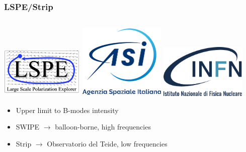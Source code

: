 \documentclass[10pt,aspectratio=169]{beamer}
\begin{document}
\begin{frame}
\frametitle{LSPE/Strip}

\begin{columns}
        \begin{column}{0.38\textwidth}
                \includegraphics[width=0.30\textwidth]{lspe}
                \includegraphics[width=0.31\textwidth]{Logo-ASI-2019}
                \includegraphics[width=0.31\textwidth]{Logo_INFN}
                \begin{itemize}
                        \item<2-> \alert{Upper limit} to B-modes intensity
                        \item<3-> \alert{SWIPE} $\rightarrow$
                        balloon-borne, high frequencies 
                        \item<4-> \alert{Strip} $\rightarrow$ Observatorio del
                        Teide, low frequencies 
                \end{itemize}
        \end{column}
\end{columns}

\end{frame}
\end{document}
